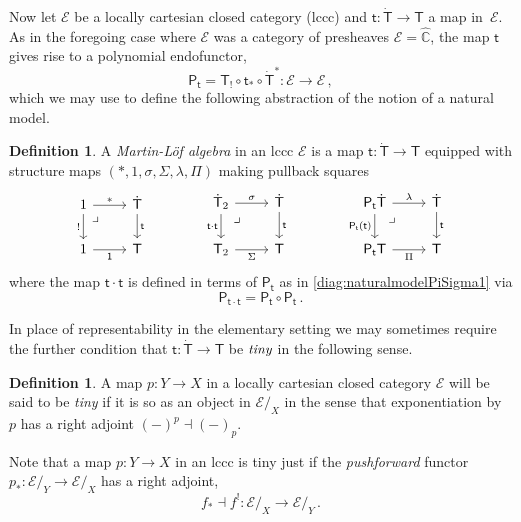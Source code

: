 \documentclass[12pt,reqno]{amsart}
\newcommand{\C}{\ensuremath{\mathbb{C}}}
\newcommand{\EE}{\ensuremath{\mathcal{E}}}
\newcommand{\alg}[1]{\ensuremath{\mathsf{#1}}}
\renewcommand{\to}{\ensuremath{\rightarrow}}
\newcommand{\too}{\ensuremath{\longrightarrow}}
\renewcommand{\t}{\ensuremath{\mathsf{t}}}
\newcommand{\tT}{\ensuremath{{\t}:\TT\to\T}}
\newcommand{\T}{\ensuremath{\mathsf{T}}}
\newcommand{\TT}{\ensuremath{\dot{\mathsf{T}}}}
\newcommand{\pbcorner}{\arrow[dr,phantom,"\lrcorner" very near start, shift right=.5ex]} %
\theoremstyle{remark}
\theoremstyle{definition}
\newtheorem{definition}[theorem]{Definition}
\begin{document}
Now let $\EE$ be a locally cartesian closed category (lccc) and $\tT$ a map in~$\EE$.  As in the foregoing case where $\EE$ was a category of presheaves $\EE=\widehat{\C}$, the map $\t$ gives rise to a polynomial endofunctor,
$$\alg{P}_\t = \T_! \circ \t_* \circ \TT^* : \EE\too\EE\,,$$
which we may use to define the following abstraction of the notion of a natural model.
\begin{definition}\label{def:MLalg}
A \emph{Martin-L\"of algebra} in an lccc $\EE$ is a map $\tT$ equipped with structure maps $(*, 1, \sigma, \Sigma, \lambda, \Pi)$ making pullback squares 
\begin{equation}\label{diag:MLalg}
\begin{tikzcd}
	1 \ar[r,"*"] \ar[d,swap,"!"] \pbcorner &  \TT \ar[d, "\t"]\\  
	1 \ar[r, swap,"\mathsf{1}"] & \T
 \end{tikzcd}\qquad \qquad 
 \begin{tikzcd}
	\TT_2  \ar[r,"\sigma"] \ar[d,swap,"\t\cdot\t"] \pbcorner &  \TT \ar[d, "\t"]\\  
	\T_2 \ar[r,swap, "\Sigma"] & \T
\end{tikzcd} \qquad \qquad 
	 \begin{tikzcd}
	\alg{P}_\t\TT \ar[r,"\lambda"] \ar[d,swap,"\alg{P}_\t(\t)"] \pbcorner &  \TT \ar[d, "\t"]\\  
	\alg{P}_\t\T \ar[r,swap, "\Pi"] & \T
 \end{tikzcd} 
 \end{equation}
 where the map $\t\cdot\t$ is defined in terms of $\alg{P}_\t$ as in \eqref{diag:naturalmodelPiSigma1} via
 \[
\alg{P}_{\t\cdot\t} = \alg{P}_{\t}\circ \alg{P}_{\t}\,.
 \]
   \end{definition}

In place of representability in the elementary setting we may sometimes require the further condition that $\tT$ be $\emph{tiny}$ in the following sense.

\begin{definition}\label{def:tinymap}
 A map $p : Y \to X$ in a locally cartesian closed category $\EE$ will be said to be \emph{tiny} if it is so as an object in $\EE/_{\!X}$ in the sense that exponentiation by $p$ has a right adjoint $(-)^p \dashv (-)_p$. 
\end{definition}

Note that a map $p : Y \to X$ in an lccc is tiny just if the \emph{pushforward} functor $p_* : \EE/_Y \to \EE/_X$ has a right adjoint,
\[
f_* \dashv f^! : \EE/_X \too \EE/_Y\,.
\]
\end{document}

